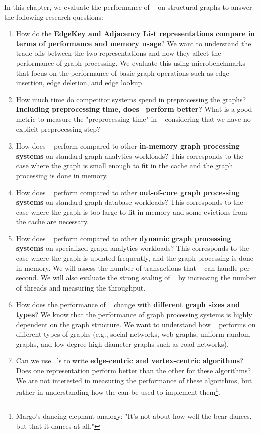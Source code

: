 In this chapter, we evaluate the performance of ~\project{} on structural graphs to answer the following research questions:
\begin{enumerate}
  \item How do the \textbf{EdgeKey and Adjacency List representations compare in terms of performance and memory usage}? We want to understand the trade-offs between the two representations and how they affect the performance of graph processing. We evaluate this using microbenchmarks that focus on the performance of basic graph operations such as edge insertion, edge deletion, and edge lookup.
  \item How much time do competitor systems spend in preprocessing the graphs? \textbf{Including preprocessing time, does~\project{} perform better?} What is a good metric to measure the "preprocessing time" in ~\project{} considering that we have no explicit preprocessing step?
  \item How does ~\project{} perform compared to other \textbf{in-memory graph processing systems} on standard graph analytics workloads? This corresponds to the case where the graph is small enough to fit in the \wt{} cache and the graph processing is done in memory.
  \item How does ~\project{} perform compared to other \textbf{out-of-core graph processing systems} on standard graph database workloads? This corresponds to the case where the graph is too large to fit in memory and some evictions from the \wt{} cache are necessary.
  \item How does ~\project{} perform compared to other \textbf{dynamic graph processing systems} on specialized graph analytics workloads? This corresponds to the case where the graph is updated frequently, and the graph processing is done in memory. We will assess the number of transactions that ~\project{} can handle per second. We will also evaluate the strong scaling of ~\project{} by increasing the number of threads and measuring the throughput.
  \item How does the performance of ~\project{} change with \textbf{different graph sizes and types}? We know that the performance of graph processing systems is highly dependent on the graph structure. We want to understand how ~\project{} performs on different types of graphs (e.g., social networks, web graphs, uniform random graphs, and low-degree high-diameter graphs such as road networks).
  \item Can we use ~\project{}'s \api{} to write \textbf{edge-centric and vertex-centric algorithms}? Does one representation perform better than the other for these algorithms? We are not interested in measuring the performance of these algorithms, but rather in understanding how the \api{} can be used to implement them\footnote{Margo's dancing elephant analogy: "It's not about how well the bear dances, but that it dances at all."}.
\end{enumerate}

